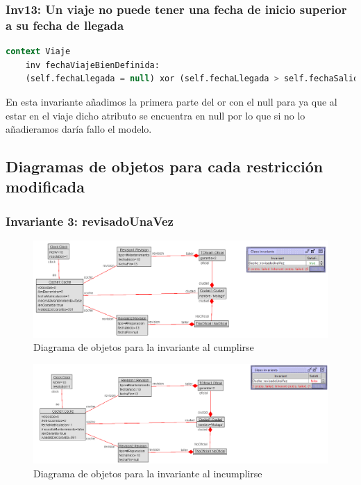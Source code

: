 \documentclass[12pt.a4paper]{article}
\begin{document}
\subsubsection{Inv13: Un viaje no puede tener una fecha de inicio superior a su fecha de llegada}
    \begin{lstlisting}[style = useEspecifico,language=SQL]
context Viaje
    inv fechaViajeBienDefinida:
    (self.fechaLlegada = null) xor (self.fechaLlegada > self.fechaSalida)
    \end{lstlisting}
    En esta invariante añadimos la primera parte del or con el null para ya que al estar en el viaje dicho atributo se encuentra en null por lo que si no lo añadieramos daría fallo el modelo.

\subsection{Diagramas de objetos para cada restricción modificada}
\subsubsection{Invariante 3: revisadoUnaVez}
\vspace{1.0 cm}
\begin{figure}[H]
     \includegraphics[width=1\linewidth]{Soils/dinamicoInv3_true.png}
     \caption{Diagrama de objetos para la invariante al cumplirse}
\end{figure}

\begin{figure}[H]
     \includegraphics[width=1\linewidth]{Soils/dinamicoInv3_false.png}
     \caption{Diagrama de objetos para la invariante al incumplirse}
\end{figure}
\end{document}
